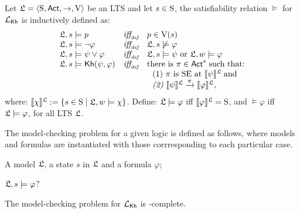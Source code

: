 \begin{definition} \label{def:semantics-kh}
    Let $\model = \tup{\S,\ACT,\ra,\V}$ be an LTS and let $s\in\S$, the satisfiability relation $\models$ for $\Khlogic$ is inductively defined as:
    \[
    \begin{array}{l@{\ \ \ }c@{\ \ \  }l}
    \model, s \models p & \iffdef & p \in \V(s) \\
    \model, s\models \neg\varphi & \iffdef & \model, s \not\models \varphi \\
    \model, s \models \psi\vee\varphi & \iffdef & \model, s \models \psi \mbox{ or }\model, w \models \varphi \\
    \model, s \models \kh(\psi,\varphi) & \iffdef & \text{there is } \plan \in \ACT^* \;\text{such that:} \\
    & & \ \ \text{\rm (1)} \ \plan \text{ is SE at }  \truthset{\model}{\psi}\; \text{and} \\
    & & \ \ \text{\em (2)} \ \truthset{\model}{\psi} \reach{\plan} \truthset{\model}{\varphi}, 
    \end{array}
    \]      where: $\truthset{\model}{\chi} := \csetsc{s\in\S}{\model,w\models\chi}$. Define: $\model\models\varphi$ iff  $\truthset{\model}{\varphi}=\S$, and $\models\varphi$ iff $\model\models\varphi$, for all LTS $\model$.
\end{definition}

The model-checking problem for a given logic is defined as follows, where models and formulas are instantiated with those corrresponding to each particular case. 

\begin{description} \itemsep 0cm
    \item[Input:] A model $\model$, a state $s$ in $\model$ and a formula $\varphi$;
    \item[Output:] $\model,s\models\varphi$?
\end{description}

\begin{proposition}
    The model-checking problem for $\Khlogic$ is \PSPACE-complete.
\end{proposition}



